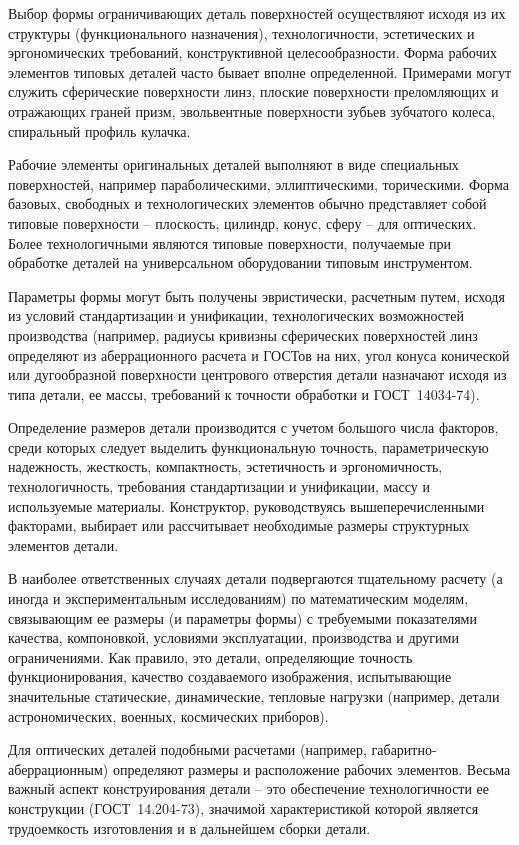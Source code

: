 Выбор формы ограничивающих деталь поверхностей осуществляют исходя из их структуры (функционального назначения), технологичности, эстетических и эргономических требований, конструктивной целесообразности. Форма рабочих элементов типовых деталей часто бывает вполне определенной. Примерами могут служить сферические поверхности линз, плоские поверхности преломляющих и отражающих граней призм, эвольвентные поверхности зубьев зубчатого колеса, спиральный профиль кулачка.

Рабочие элементы оригинальных деталей выполняют в виде специальных поверхностей, например параболическими, эллиптическими, торическими. Форма базовых, свободных и технологических элементов обычно представляет собой типовые поверхности -- плоскость, цилиндр, конус, сферу -- для оптических. Более технологичными являются типовые поверхности, получаемые при обработке деталей на универсальном оборудовании типовым инструментом.

Параметры формы могут быть получены эвристически, расчетным путем, исходя из условий стандартизации и унификации, технологических возможностей производства (например, радиусы кривизны сферических поверхностей линз определяют из аберрационного расчета и ГОСТов на них, угол конуса конической или дугообразной поверхности центрового отверстия детали назначают исходя из типа детали, ее массы, требований к точности обработки и ГОСТ~14034-74).

Определение размеров детали производится с учетом большого числа факторов, среди которых следует выделить функциональную точность, параметрическую надежность, жесткость, компактность, эстетичность и эргономичность, технологичность, требования стандартизации и унификации, массу и используемые материалы. Конструктор, руководствуясь вышеперечисленными факторами, выбирает или рассчитывает необходимые размеры структурных элементов детали.

В наиболее ответственных случаях детали подвергаются тщательному расчету (а иногда и экспериментальным исследованиям) по математическим моделям, связывающим ее размеры (и параметры формы) с требуемыми показателями качества, компоновкой, условиями эксплуатации, производства и другими ограничениями. Как правило, это детали, определяющие точность функционирования, качество создаваемого изображения, испытывающие значительные статические, динамические, тепловые нагрузки (например, детали астрономических, военных, космических приборов).

Для оптических деталей подобными расчетами (например, габаритно-аберрационным) определяют размеры и расположение рабочих элементов. Весьма важный аспект конструирования детали -- это обеспечение технологичности ее конструкции (ГОСТ~14.204-73), значимой характеристикой которой является трудоемкость изготовления и в дальнейшем сборки детали.

